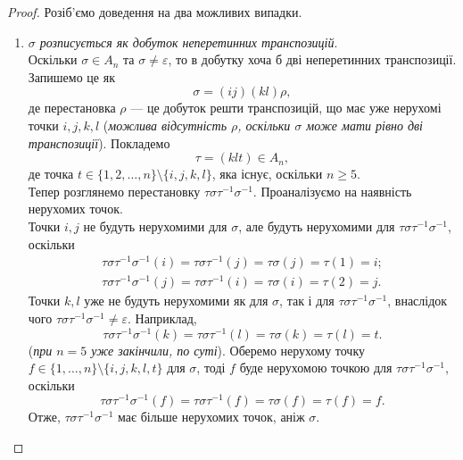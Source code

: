 \documentclass{math_library}
\begin{document}
\begin{proof}
Розіб'ємо доведення на два можливих випадки.

\begin{enumerate}[wide=0pt,label={\Roman*.}]
\item \textit{$\sigma$ розписується як добуток неперетинних транспозицій}.\\
Оскільки $\sigma \in A_n$ та $\sigma \neq \varepsilon$, то в добутку хоча б дві неперетинних транспозиції. Запишемо це як
\[ 
\sigma = (ij)(kl) \rho,
\]
де перестановка $\rho$ --- це добуток решти транспозицій, що має уже нерухомі точки $i,j,k,l$ (\textit{можлива відсутність $\rho$, оскільки $\sigma$ може мати рівно дві транспозиції}). Покладемо 
\[
\tau = (klt) \in A_n,
\]
де точка $t \in \{1,2,\dots,n\} \setminus \{i,j,k,l\}$, яка існує, оскільки $n \geq 5$.\\
Тепер розглянемо перестановку $\tau \sigma \tau^{-1} \sigma^{-1}$. Проаналізуємо на наявність нерухомих точок.\\
Точки $i,j$ не будуть нерухомими для $\sigma$, але будуть нерухомими для $\tau \sigma \tau^{-1} \sigma^{-1}$, оскільки
\begin{align*}
\tau \sigma \tau^{-1} \sigma^{-1} (i) = \tau \sigma \tau^{-1}(j) = \tau \sigma(j) = \tau(1) = i; \\
\tau \sigma \tau^{-1} \sigma^{-1} (j) = \tau \sigma \tau^{-1}(i) = \tau \sigma (i) = \tau (2) = j.
\end{align*}
Точки $k,l$ уже не будуть нерухомими як для $\sigma$, так і для $\tau \sigma \tau^{-1} \sigma^{-1}$, внаслідок чого $\tau \sigma \tau^{-1} \sigma^{-1} \neq \varepsilon$. Наприклад,
\[
\tau \sigma \tau^{-1} \sigma^{-1} (k) = \tau \sigma \tau^{-1} (l) = \tau \sigma(k) = \tau(l) = t.
\]
(\textit{при $n = 5$ уже закінчили, по суті}). Оберемо нерухому точку $f \in \{1,\dots,n\} \setminus \{i,j,k,l,t\}$ для $\sigma$, тоді $f$ буде нерухомою точкою для $\tau \sigma \tau^{-1} \sigma^{-1}$, оскільки 
\[
\tau \sigma \tau^{-1} \sigma^{-1} (f) = \tau \sigma \tau^{-1} (f) = \tau \sigma (f) = \tau (f) = f.
\]
Отже, $\tau \sigma \tau^{-1} \sigma^{-1}$ має більше нерухомих точок, аніж $\sigma$.


\end{enumerate}
\end{proof}
\end{document}
